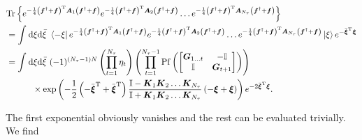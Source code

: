 \documentclass{article}
\begin{document}
\begin{align}
	&\mathrm{Tr} \left\{e^{-\frac{1}{4}\left(\boldsymbol{f}^{\dagger} + \boldsymbol{f} \right)^{\mathrm{T}} \boldsymbol{A}_{1}  \left(\boldsymbol{f}^{\dagger} + \boldsymbol{f} \right) }e^{-\frac{1}{4}\left(\boldsymbol{f}^{\dagger} + \boldsymbol{f} \right)^{\mathrm{T}} \boldsymbol{A}_{2}  \left(\boldsymbol{f}^{\dagger} + \boldsymbol{f} \right) }\dots e^{-\frac{1}{4}\left(\boldsymbol{f}^{\dagger} + \boldsymbol{f} \right)^{\mathrm{T}} \boldsymbol{A}_{N_{\tau} }  \left(\boldsymbol{f}^{\dagger} + \boldsymbol{f} \right) } \right\}\\ 
	&= \int_{ }^{ } \mathrm{d}\xi \mathrm{d} \bar{\xi}\,\,\bra{-\xi} e^{-\frac{1}{4}\left(\boldsymbol{f}^{\dagger} + \boldsymbol{f} \right)^{\mathrm{T}} \boldsymbol{A}_{1}  \left(\boldsymbol{f}^{\dagger} + \boldsymbol{f} \right) }e^{-\frac{1}{4}\left(\boldsymbol{f}^{\dagger} + \boldsymbol{f} \right)^{\mathrm{T}} \boldsymbol{A}_{2}  \left(\boldsymbol{f}^{\dagger} + \boldsymbol{f} \right) }\dots e^{-\frac{1}{4}\left(\boldsymbol{f}^{\dagger} + \boldsymbol{f} \right)^{\mathrm{T}} \boldsymbol{A}_{N_{\tau} }  \left(\boldsymbol{f}^{\dagger} + \boldsymbol{f} \right) } \ket{\xi}e^{-\bar{\boldsymbol{\xi}}^{\mathrm{T}  }\boldsymbol{\xi} } \nonumber \\
	&= \int_{ }^{ } \mathrm{d}\xi\mathrm{d}\bar{\xi}\,\,  (-1)^{\left(N_{\tau}-1\right)N}\left(\prod_{t=1}^{N_\tau} \eta_t\right)\left(\prod_{t=1}^{N_\tau - 1} \mathrm{Pf} \left(\begin{bmatrix}
		\boldsymbol{G}_{1\dots t} & - \mathbb{I} \\
		\mathbb{I} & \boldsymbol{G}_{t + 1} 
	\end{bmatrix} \right) \right) \nonumber \\
	&\quad\quad\quad\times\exp \left( -\frac{1}{2}\left(-\bar{\boldsymbol{\xi} }^{\mathrm{T}  } + \bar{\boldsymbol{\xi}}^{\mathrm{T}  } \right) \frac{\mathbb{I} - \boldsymbol{K}_{1}\boldsymbol{K}_2\dots \boldsymbol{K}_{N_\tau} }{\mathbb{I} + \boldsymbol{K}_{1}\boldsymbol{K}_2\dots \boldsymbol{K}_{N_\tau}  }\left(-{\boldsymbol{\xi} } + \boldsymbol{\xi}\right) \right)
	e^{-2\bar{\boldsymbol{\xi}}^{\mathrm{T}  }\boldsymbol{\xi} }.
\end{align}

The first exponential obviously vanishes and the rest can be evaluated trivially. We find
\end{document}
